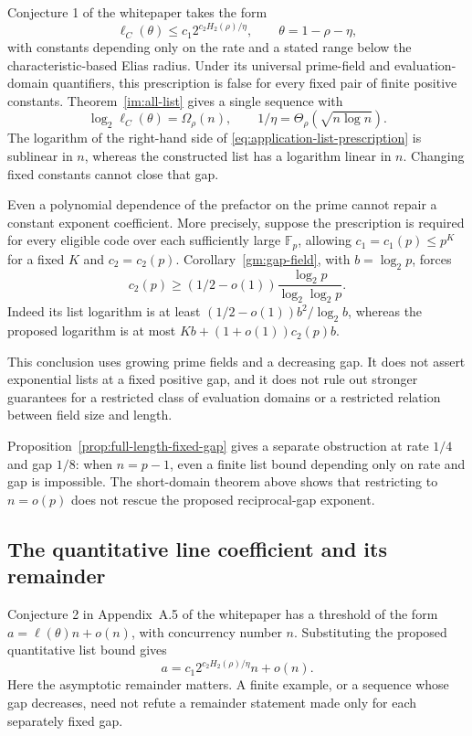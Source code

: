\documentclass[11pt,letterpaper]{article}
\theoremstyle{definition}
\theoremstyle{remark}
\newcommand{\F}{\mathbb F}
\begin{document}
Conjecture 1 of the whitepaper takes the form
\begin{equation}
\label{eq:application-list-prescription}
 \ell_C(\theta)\le c_1 2^{c_2H_2(\rho)/\eta},\qquad
 \theta=1-\rho-\eta,
\end{equation}
with constants depending only on the rate and a stated range below
the characteristic-based Elias radius. Under its universal
prime-field and evaluation-domain quantifiers, this prescription is
false for every fixed pair of finite positive constants.
Theorem~\ref{im:all-list} gives a single sequence with
\[
 \log_2\ell_C(\theta)=\Omega_\rho(n),\qquad
 1/\eta=\Theta_\rho(\sqrt{n\log n}).
\]
The logarithm of the right-hand side of
\eqref{eq:application-list-prescription} is sublinear in $n$, whereas
the constructed list has a logarithm linear in $n$. Changing fixed
constants cannot close that gap.

Even a polynomial dependence of the prefactor on the prime cannot
repair a constant exponent coefficient. More precisely, suppose the
prescription is required for every eligible code over each sufficiently
large $\F_p$, allowing $c_1=c_1(p)\le p^K$ for a fixed $K$ and
$c_2=c_2(p)$. Corollary~\ref{gm:gap-field}, with $b=\log_2p$,
forces
\[
 c_2(p)\ge(1/2-o(1))\frac{\log_2p}{\log_2\log_2p}.
\]
Indeed its list logarithm is at least $(1/2-o(1))b^2/\log_2b$,
whereas the proposed logarithm is at most $Kb+(1+o(1))c_2(p)b$.

This conclusion uses growing prime fields and a decreasing gap.
It does not assert exponential lists at a fixed positive gap, and it
does not rule out stronger guarantees for a restricted class of
evaluation domains or a restricted relation between field size and
length.

Proposition~\ref{prop:full-length-fixed-gap} gives a separate obstruction
at rate $1/4$ and gap $1/8$: when $n=p-1$, even a finite list bound
depending only on rate and gap is impossible. The short-domain theorem
above shows that restricting to $n=o(p)$ does not rescue the proposed
reciprocal-gap exponent.

\subsection{The quantitative line coefficient and its remainder}

Conjecture 2 in Appendix~A.5 of the whitepaper has a threshold
of the form $a=\ell(\theta)n+o(n)$, with concurrency number $n$.
Substituting the proposed quantitative list bound gives
\begin{equation}
\label{eq:application-line-prescription}
 a=c_1 2^{c_2H_2(\rho)/\eta}n+o(n).
\end{equation}
Here the asymptotic remainder matters. A finite example, or a sequence
whose gap decreases, need not refute a remainder statement made only
for each separately fixed gap.
\end{document}
